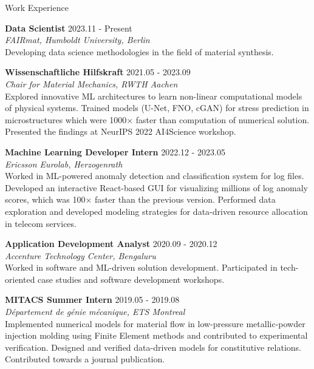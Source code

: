 \documentclass{cv}
\begin{document}
  \begin{rSection}{Work Experience}
    \item{\bf Data Scientist} \hfill {2023.11 - Present}\\
    {\em FAIRmat, Humboldt University, Berlin}\\
    Developing data science methodologies in the field of material synthesis.

    \item {\bf Wissenschaftliche Hilfskraft} \hfill {2021.05 - 2023.09}\\
    {\em Chair for Material Mechanics, RWTH Aachen}\\
    Explored innovative ML architectures to learn non-linear computational models of physical systems. 
    Trained models (U-Net, FNO, cGAN) for stress prediction in microstructures which were 1000$\times$ faster than computation of numerical solution.
    Presented the findings at NeurIPS 2022 AI4Science workshop.
    
    \item{\bf Machine Learning Developer Intern} \hfill {2022.12 - 2023.05}\\
    {\em Ericsson Eurolab, Herzogenrath}\\
    Worked in ML-powered anomaly detection and classification system for log files. 
    Developed an interactive React-based GUI for visualizing millions of log anomaly scores, which was 100$\times$ faster than the previous version.
    Performed data exploration and developed modeling strategies for data-driven resource allocation in telecom services. 
    
    \item {\bf Application Development Analyst} \hfill {2020.09 - 2020.12}\\
    {\em Accenture Technology Center, Bengaluru}\\
    Worked in software and ML-driven solution development. 
    Participated in tech-oriented case studies and software development workshops.
    
    \item {\bf MITACS Summer Intern} \hfill {2019.05 - 2019.08}\\
    {\em Département de génie mécanique, ETS Montreal}\\
    Implemented numerical models for material flow in low-pressure metallic-powder injection molding using Finite Element methods and contributed to experimental verification.
    Designed and verified data-driven models for constitutive relations. Contributed towards a journal publication.
  \end{rSection}
\end{document}
